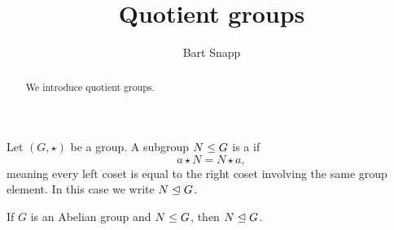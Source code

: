 \documentclass{ximera}
\author{Bart Snapp}
\title{Quotient groups}
\begin{document}
\begin{abstract}
  We introduce quotient groups.
\end{abstract}
\maketitle

\begin{definition}
  Let $(G,\star)$ be a group. A subgroup $N\leq G$ is a 
  if
  \[
  a\star N = N\star a,
  \]
  meaning every left coset is equal to the right coset involving the
  same group element. In this case we write $N\trianglelefteq G$. 
\end{definition}

\begin{corollary}
  If $G$ is an Abelian group and $N\leq G$, then $N\trianglelefteq G$.
\end{corollary}
\end{document}
